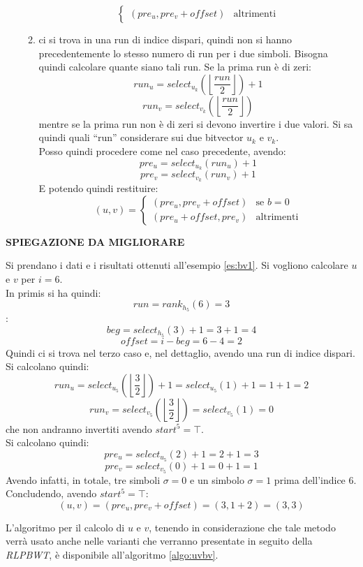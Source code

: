 \begin{enumerate}
\begin{enumerate}
\[\begin{cases}
        (pre_u,pre_v+offset)&\mbox{altrimenti}
      \end{cases}
    \]
    \item ci si trova in una run di indice dispari, quindi non si hanno
    precedentemente lo stesso numero di run per i due simboli. Bisogna quindi
    calcolare quante siano tali run. Se la prima run è di zeri:
    \[run_u=select_{u_k}\left(\left\lfloor\frac{run}{2}\right\rfloor\right)+1\]
    \[run_v=select_{v_k}\left(\left\lfloor\frac{run}{2}\right\rfloor\right)\]
    mentre se la prima run non è di zeri si devono invertire i due valori. Si sa
    quindi quali ``run'' considerare sui due bitvector $u_k$ e $v_k$.\\
    Posso quindi procedere come nel caso precedente, avendo:
    \[pre_u=select_{u_k}(run_u)+1\]
    \[pre_v=select_{v_k}(run_v)+1\]
    E potendo quindi restituire:
    \[(u,v)=
      \begin{cases}
        (pre_u,pre_v+offset)&\mbox{se } b=0\\
        (pre_u+offset,pre_v)&\mbox{altrimenti}
      \end{cases}
    \]
  \end{enumerate}
\end{enumerate}
\textbf{SPIEGAZIONE DA MIGLIORARE}
\begin{esempio}
  Si prendano i dati e i risultati ottenuti all'esempio \ref{es:bv1}. Si
  vogliono calcolare $u$ e $v$ per $i=6$.\\
  In primis si ha quindi:
  \[run=rank_{h_5}(6)=3\]:
  \[beg = select_{h_5}(3)+1=3+1=4\]
  \[offset = i-beg=6-4=2\]
  Quindi ci si trova nel terzo caso e, nel dettaglio, avendo una run di
  indice dispari. Si calcolano quindi:
  \[run_u=select_{u_5}\left(\left\lfloor\frac{3}{2}\right\rfloor\right)+1=
    select_{u_5}(1)+1
    =1+1=2\] 
  \[run_v=select_{v_5}\left(\left\lfloor\frac{3}{2}\right\rfloor\right)=
    select_{v_5}(1)=0\] 
  che non andranno invertiti avendo $start^5=\top$.\\
  Si calcolano quindi:
  \[pre_u=select_{u_5}(2)+1=2+1=3\]
  \[pre_v=select_{v_5}(0)+1=0+1=1\]
  Avendo infatti, in totale, tre simboli $\sigma=0$ e un simbolo $\sigma=1$
  prima dell'indice 6.\\ 
  Concludendo, avendo $start^5=\top$:
  \[(u,v)=(pre_u, pre_v + offset)=(3,1+2)=(3,3)\]
\end{esempio}
L'algoritmo per il calcolo di $u$ e $v$, tenendo in considerazione che tale
metodo verrà usato anche nelle varianti che verranno presentate in seguito della
\textit{RLPBWT}, è disponibile all'algoritmo \ref{algo:uvbv}.